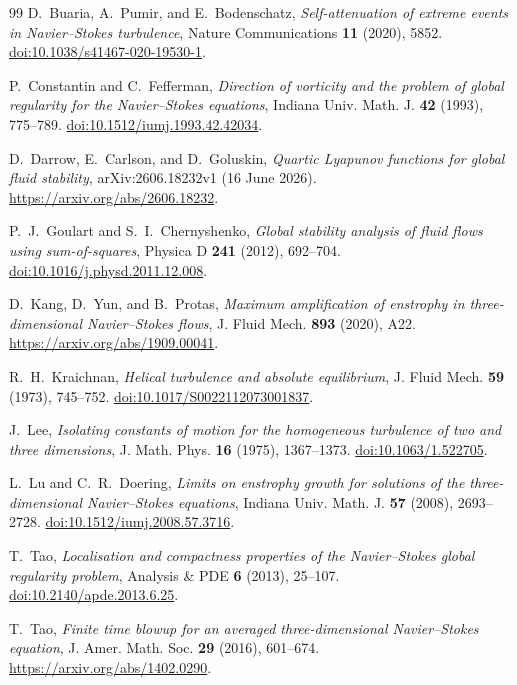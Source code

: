 \documentclass[11pt]{article}
\theoremstyle{remark}
\begin{document}
\begin{thebibliography}{99}
D.~Buaria, A.~Pumir, and E.~Bodenschatz,
\emph{Self-attenuation of extreme events in Navier--Stokes turbulence},
Nature Communications \textbf{11} (2020), 5852.
\href{https://doi.org/10.1038/s41467-020-19530-1}{doi:10.1038/s41467-020-19530-1}.

P.~Constantin and C.~Fefferman,
\emph{Direction of vorticity and the problem of global regularity for the
Navier--Stokes equations}, Indiana Univ. Math. J. \textbf{42} (1993), 775--789.
\href{https://doi.org/10.1512/iumj.1993.42.42034}{doi:10.1512/iumj.1993.42.42034}.

D.~Darrow, E.~Carlson, and D.~Goluskin,
\emph{Quartic Lyapunov functions for global fluid stability},
arXiv:2606.18232v1 (16 June 2026).
\url{https://arxiv.org/abs/2606.18232}.

P.~J.~Goulart and S.~I.~Chernyshenko,
\emph{Global stability analysis of fluid flows using sum-of-squares},
Physica D \textbf{241} (2012), 692--704.
\href{https://doi.org/10.1016/j.physd.2011.12.008}{doi:10.1016/j.physd.2011.12.008}.

D.~Kang, D.~Yun, and B.~Protas,
\emph{Maximum amplification of enstrophy in three-dimensional
Navier--Stokes flows}, J. Fluid Mech. \textbf{893} (2020), A22.
\url{https://arxiv.org/abs/1909.00041}.

R.~H.~Kraichnan,
\emph{Helical turbulence and absolute equilibrium},
J. Fluid Mech. \textbf{59} (1973), 745--752.
\href{https://doi.org/10.1017/S0022112073001837}{doi:10.1017/S0022112073001837}.

J.~Lee,
\emph{Isolating constants of motion for the homogeneous turbulence of two
and three dimensions}, J. Math. Phys. \textbf{16} (1975), 1367--1373.
\href{https://doi.org/10.1063/1.522705}{doi:10.1063/1.522705}.

L.~Lu and C.~R.~Doering,
\emph{Limits on enstrophy growth for solutions of the three-dimensional
Navier--Stokes equations}, Indiana Univ. Math. J. \textbf{57} (2008), 2693--2728.
\href{https://doi.org/10.1512/iumj.2008.57.3716}{doi:10.1512/iumj.2008.57.3716}.

T.~Tao,
\emph{Localisation and compactness properties of the Navier--Stokes global
regularity problem}, Analysis \& PDE \textbf{6} (2013), 25--107.
\href{https://doi.org/10.2140/apde.2013.6.25}{doi:10.2140/apde.2013.6.25}.

T.~Tao,
\emph{Finite time blowup for an averaged three-dimensional Navier--Stokes
equation}, J. Amer. Math. Soc. \textbf{29} (2016), 601--674.
\url{https://arxiv.org/abs/1402.0290}.
\end{thebibliography}
\end{document}
